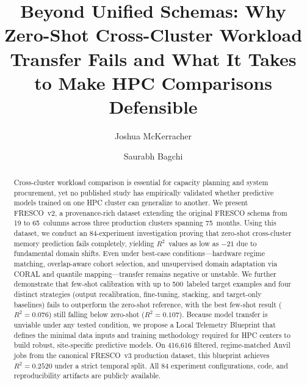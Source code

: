 \documentclass[sigconf]{acmart}
\begin{document}
\title{Beyond Unified Schemas: Why Zero-Shot Cross-Cluster Workload Transfer Fails and What It Takes to Make HPC Comparisons Defensible}

\author{Joshua McKerracher}

\author{Saurabh Bagchi}

\renewcommand{\shortauthors}{McKerracher and Bagchi}

\begin{abstract}
Cross-cluster workload comparison is essential for capacity planning and system procurement, yet no published study has empirically validated whether predictive models trained on one HPC cluster can generalize to another.
We present FRESCO~v2, a provenance-rich dataset extending the original FRESCO schema from 19 to 65~columns across three production clusters spanning 75~months.
Using this dataset, we conduct an 84-experiment investigation proving that zero-shot cross-cluster memory prediction fails completely, yielding $R^2$~values as low as $-21$ due to fundamental domain shifts.
Even under best-case conditions---hardware regime matching, overlap-aware cohort selection, and unsupervised domain adaptation via CORAL and quantile mapping---transfer remains negative or unstable.
We further demonstrate that few-shot calibration with up to 500~labeled target examples and four distinct strategies (output recalibration, fine-tuning, stacking, and target-only baselines) fails to outperform the zero-shot reference, with the best few-shot result ($R^2 = 0.076$) still falling below zero-shot ($R^2 = 0.107$).
Because model transfer is unviable under any tested condition, we propose a Local Telemetry Blueprint that defines the minimal data inputs and training methodology required for HPC centers to build robust, site-specific predictive models. On 416,616 filtered, regime-matched Anvil jobs from the canonical FRESCO~v3 production dataset, this blueprint achieves $R^2 = 0.2520$ under a strict temporal split.
All 84 experiment configurations, code, and reproducibility artifacts are publicly available.
\end{abstract}
\end{document}
